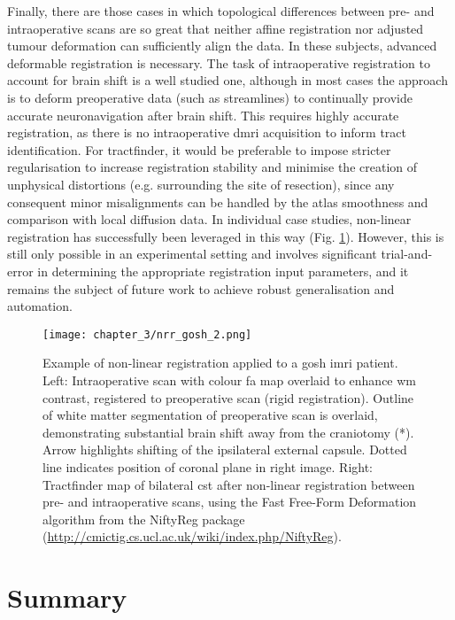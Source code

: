 Finally, there are those cases in which topological differences between pre- and intraoperative scans are so great that neither affine registration nor adjusted tumour deformation can sufficiently align the data.
In these subjects, advanced deformable registration is necessary.
The task of intraoperative registration to account for brain shift is a well studied one, although in most cases the approach is to deform preoperative data (such as streamlines) to continually provide accurate neuronavigation after brain shift.\autocite{Clatz2005,Archip2007,Wittek2007,Archip2008}
This requires highly accurate registration, as there is no intraoperative \gls{dmri} acquisition to inform tract identification.
For tractfinder, it would be preferable to impose stricter regularisation to increase registration stability and minimise the creation of unphysical distortions (e.g. surrounding the site of resection), since any consequent minor misalignments can be handled by the atlas smoothness and comparison with local diffusion data.
In individual case studies, non-linear registration has successfully been leveraged in this way (Fig. \ref{fig:nrrex}).
However, this is still only possible in an experimental setting and involves significant trial-and-error in determining the appropriate registration input parameters, and it remains the subject of future work to achieve robust generalisation and automation.

\begin{figure}[hb!]
  \centering
  \texttt{[image: chapter\_3/nrr\_gosh\_2.png]}
  \caption[Nonlinear registration for intraoperative MRI example]{Example of non-linear registration applied to a \gls{gosh} \gls{imri} patient. Left: Intraoperative scan with colour \gls{fa} map overlaid to enhance \gls{wm} contrast, registered to preoperative scan (rigid registration). Outline of white matter segmentation of preoperative scan is overlaid, demonstrating substantial brain shift away from the craniotomy (*). Arrow highlights shifting of the ipsilateral external capsule. Dotted line indicates position of coronal plane in right image. Right: Tractfinder map of bilateral \gls{cst} after non-linear registration between pre- and intraoperative scans, using the Fast Free-Form Deformation algorithm\autocite{Modat2010} from the NiftyReg package (\url{http://cmictig.cs.ucl.ac.uk/wiki/index.php/NiftyReg}).}
  \label{fig:nrrex}
\end{figure}

\section{Summary}

